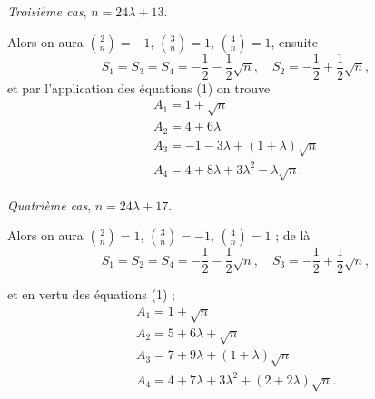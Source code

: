 \documentclass[11pt,a4paper]{article}
\begin{document}
\textit{Troisième cas}, $n = 24\lambda + 13$.

Alors on aura $\left(\frac{2}{n}\right) = -1$, $\left(\frac{3}{n}\right) = 1$,
$\left(\frac{4}{n}\right) = 1$, ensuite
\[
S_1 = S_3 = S_4 = -\frac{1}{2} - \frac{1}{2}\sqrt{n},\quad S_2 = -\frac{1}{2} + \frac{1}{2}\sqrt{n},
\]
et par l'application des équations (1) on trouve
\[
\begin{array}{l}
A_1 = 1 + \sqrt{n} \\
A_2 = 4 + 6\lambda \\
A_3 = -1 - 3\lambda + (1 + \lambda)\sqrt{n} \\
A_4 = 4 + 8\lambda + 3\lambda^2 - \lambda\sqrt{n}.
\end{array}
\]

\textit{Quatrième cas}, $n = 24\lambda + 17$.

Alors on aura $\left(\frac{2}{n}\right) = 1$, $\left(\frac{3}{n}\right) = -1$,
$\left(\frac{4}{n}\right) = 1$ ; de là
\[
S_1 = S_2 = S_4 = -\frac{1}{2} - \frac{1}{2}\sqrt{n},\quad S_3 = -\frac{1}{2} + \frac{1}{2}\sqrt{n},
\]


et en vertu des équations (1) ;
\[
\begin{array}{l}
A_1 = 1 + \sqrt{n} \\
A_2 = 5 + 6\lambda + \sqrt{n} \\
A_3 = 7 + 9\lambda + (1 + \lambda)\sqrt{n} \\
A_4 = 4 + 7\lambda + 3\lambda^2 + (2 + 2\lambda)\sqrt{n}.
\end{array}
\]
\end{document}
